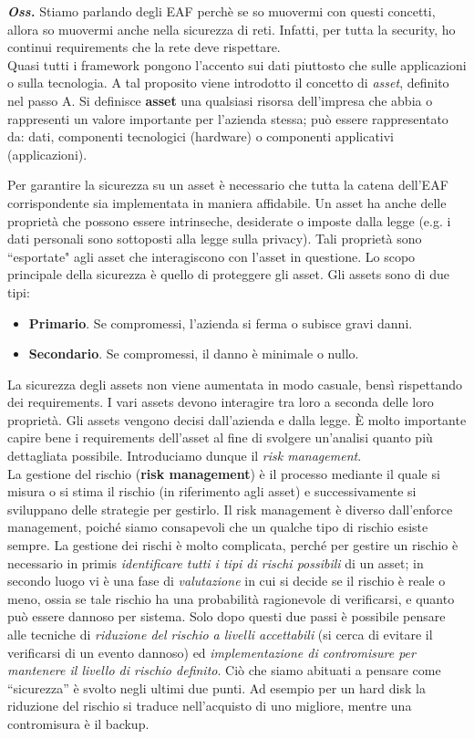 \textbf{\textit{Oss.}} Stiamo parlando degli EAF perchè se so muovermi con questi concetti, allora so muovermi anche nella sicurezza di reti. Infatti, per tutta la security, ho continui requirements che la rete deve rispettare.\\

Quasi tutti i framework pongono l'accento sui dati piuttosto che sulle applicazioni o sulla tecnologia. A tal proposito viene introdotto il concetto di \textit{asset}, definito nel passo A.
Si definisce \textbf{asset} una qualsiasi risorsa dell'impresa che abbia o rappresenti un valore importante per l'azienda stessa; può essere rappresentato da: dati, componenti tecnologici (hardware) o componenti applicativi (applicazioni).

Per garantire la sicurezza su un asset è necessario che tutta la catena dell'EAF corrispondente sia implementata in maniera affidabile. Un asset ha anche delle proprietà che possono essere intrinseche, desiderate o imposte dalla legge (e.g. i dati personali sono sottoposti alla legge sulla privacy). Tali proprietà sono \textquotedblleft esportate" agli asset che interagiscono con l'asset in questione. Lo scopo principale della sicurezza è quello di proteggere gli asset. Gli assets sono di due tipi:
\begin{itemize}
	\item \textbf{Primario}. Se compromessi, l'azienda si ferma o subisce gravi danni.
	\item \textbf{Secondario}. Se compromessi, il danno è minimale o nullo.
\end{itemize}
La sicurezza degli assets non viene aumentata in modo casuale, bensì rispettando dei requirements. I vari assets devono interagire tra loro a seconda delle loro proprietà. Gli assets vengono decisi dall'azienda e dalla legge. È molto importante capire bene i requirements dell'asset al fine di svolgere un'analisi quanto più dettagliata possibile. Introduciamo dunque il \textit{risk management}.\\

La gestione del rischio (\textbf{risk management}) è il processo mediante il quale si misura o si stima il rischio (in riferimento agli asset) e successivamente si sviluppano delle strategie per gestirlo. Il risk management è diverso dall'enforce management, poiché siamo consapevoli che un qualche tipo di rischio esiste sempre. La gestione dei rischi è molto complicata, perché per gestire un rischio è necessario in primis \textit{identificare tutti i tipi di rischi possibili} di un asset; in secondo luogo vi è una fase di \textit{valutazione} in cui si decide se il rischio è reale o meno, ossia se tale rischio ha una probabilità ragionevole di verificarsi, e quanto può essere dannoso per sistema. Solo dopo questi due passi è possibile pensare alle tecniche di \textit{riduzione del rischio a livelli accettabili} (si cerca di evitare il verificarsi di un evento dannoso) ed \textit{implementazione di contromisure per mantenere il livello di rischio definito}. Ciò che siamo abituati a pensare come “sicurezza” è svolto negli ultimi due punti. Ad esempio per un hard disk la riduzione del rischio si traduce nell'acquisto di uno migliore, mentre una contromisura è il backup.

